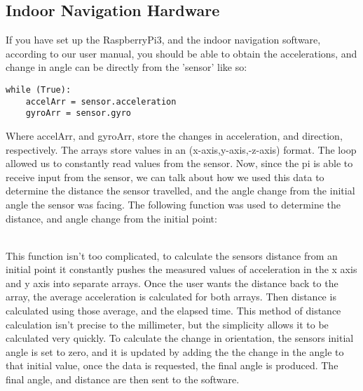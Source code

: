 \documentclass[letterpaper,12pt]{article}
\begin{document}
\subsection{Indoor Navigation Hardware}
If you have set up the RaspberryPi3, and the indoor navigation software, according to our user manual, you should be able to obtain the accelerations, and change in angle can be directly from the  'sensor' like so:
\begin{lstlisting}
while (True):
    accelArr = sensor.acceleration 
    gyroArr = sensor.gyro
\end{lstlisting}

Where accelArr, and gyroArr, store the changes in acceleration, and direction, respectively. The arrays store values in an (x-axis,y-axis,-z-axis) format. The loop allowed us to constantly read values from the sensor. Now, since the pi is able to receive input from the sensor, we can talk about how we used this data to determine the distance the sensor travelled, and the angle change from the initial angle the sensor was facing. The following function was used to determine the distance, and angle change from the initial point:\par
{}\\
This function isn't too complicated, to calculate the sensors distance from an initial point it constantly pushes the measured values of acceleration in the x axis and y axis into separate arrays. Once the user wants the distance back to the array, the average acceleration is calculated for both arrays. Then distance is calculated using those average, and the elapsed time. This method of distance calculation isn't precise to the millimeter, but the simplicity allows it to be calculated very quickly. To calculate the change in orientation, the sensors initial angle is set to zero, and it is updated by adding the the change in the angle to that initial value, once the data is requested, the final angle is produced. The final angle, and distance are then sent to the software.  
\end{document}

